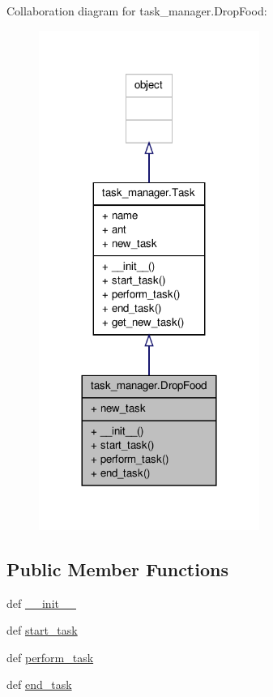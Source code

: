 Collaboration diagram for task\+\_\+manager.\+Drop\+Food\+:
\nopagebreak
\begin{figure}[H]
\begin{center}
\leavevmode
\includegraphics[width=204pt]{classtask__manager_1_1DropFood__coll__graph}
\end{center}
\end{figure}
\subsection*{Public Member Functions}
\begin{DoxyCompactItemize}
\item 
def \hyperlink{classtask__manager_1_1DropFood_a0f759e307357de441edd8465313ca4e8}{\+\_\+\+\_\+init\+\_\+\+\_\+}
\item 
def \hyperlink{classtask__manager_1_1DropFood_ab086df733d469229b17fdc652155aa3d}{start\+\_\+task}
\item 
def \hyperlink{classtask__manager_1_1DropFood_a82661a2394895191b28bb7ac1aeb5bf4}{perform\+\_\+task}
\item 
def \hyperlink{classtask__manager_1_1DropFood_aedccf366d55d4b081239ff27b72d896d}{end\+\_\+task}
\end{DoxyCompactItemize}
